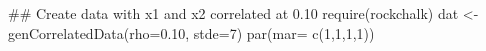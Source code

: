 \begin{Schunk}
\begin{Sinput}
 ## Create data with x1 and x2 correlated at 0.10
 require(rockchalk)
 dat <- genCorrelatedData(rho=0.10, stde=7)
 par(mar= c(1,1,1,1))
\end{Sinput}
\end{Schunk}
